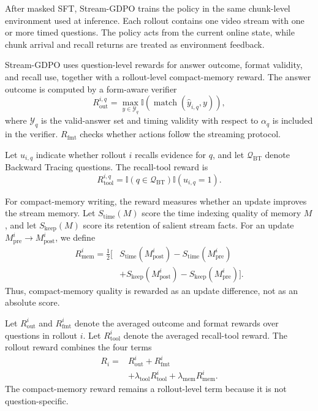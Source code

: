 After masked SFT, Stream-GDPO trains the policy in the same chunk-level environment used at inference.
Each rollout contains one video stream with one or more timed questions.
The policy acts from the current online state, while chunk arrival and recall returns are treated as environment feedback.

Stream-GDPO uses question-level rewards for answer outcome, format validity, and recall use, together with a rollout-level compact-memory reward.
The answer outcome is computed by a form-aware verifier
\begin{equation}
  R_{\mathrm{out}}^{i,q}
  =
  \max_{y\in\mathcal Y_q}
  \mathbb I\!\left(\operatorname{match}(\hat y_{i,q},y)\right),
\end{equation}
where \(\mathcal Y_q\) is the valid-answer set and timing validity with respect to \(\alpha_q\) is included in the verifier.
\(R_{\mathrm{fmt}}\) checks whether actions follow the streaming protocol.

Let \(u_{i,q}\) indicate whether rollout \(i\) recalls evidence for \(q\), and let \(\mathcal Q_{\mathrm{BT}}\) denote Backward Tracing questions.
The recall-tool reward is
\begin{equation}
  R_{\mathrm{tool}}^{i,q}
  =
  \mathbb I(q\in\mathcal Q_{\mathrm{BT}})
  \mathbb I(u_{i,q}=1).
\end{equation}

For compact-memory writing, the reward measures whether an update improves the stream memory.
Let \(S_{\mathrm{time}}(M)\) score the time indexing quality of memory \(M\), and let \(S_{\mathrm{keep}}(M)\) score its retention of salient stream facts.
For an update \(M_{\mathrm{pre}}^i\to M_{\mathrm{post}}^i\), we define
\begin{equation}
  \begin{aligned}
  R_{\mathrm{mem}}^i
  =
  \frac{1}{2}\Big[
  &S_{\mathrm{time}}(M_{\mathrm{post}}^i)-S_{\mathrm{time}}(M_{\mathrm{pre}}^i)\\
  &+S_{\mathrm{keep}}(M_{\mathrm{post}}^i)-S_{\mathrm{keep}}(M_{\mathrm{pre}}^i)
  \Big].
  \end{aligned}
\end{equation}
Thus, compact-memory quality is rewarded as an update difference, not as an absolute score.

Let \(R_{\mathrm{out}}^i\) and \(R_{\mathrm{fmt}}^i\) denote the averaged outcome and format rewards over questions in rollout \(i\).
Let \(R_{\mathrm{tool}}^i\) denote the averaged recall-tool reward.
The rollout reward combines the four terms
\begin{equation}
  \begin{aligned}
  R_i={}&
  R_{\mathrm{out}}^i
  +R_{\mathrm{fmt}}^i\\
  &+\lambda_{\mathrm{tool}}R_{\mathrm{tool}}^i
  +\lambda_{\mathrm{mem}}R_{\mathrm{mem}}^i.
  \end{aligned}
\end{equation}
The compact-memory reward remains a rollout-level term because it is not question-specific.


